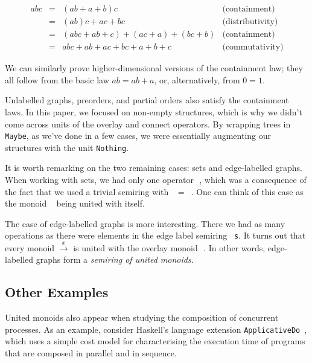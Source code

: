 \documentclass[crc,english]{programming}
\newcommand{\code}[1]{\lstinline[mathescape]|#1|}
\newcommand{\hcode}[1]{{\color{darkblue} \lstinline[keywordstyle={}]|#1|}} %
\newcommand{\hdia}{\,\text{\raisebox{-0.2mm}{\Large\color{darkblue} $\diamond$}}\,}
\newcommand{\zero}{\raisebox{-0.2mm}{\textcircled{\textsf{0}}}\xspace}
\newcommand{\one}{\raisebox{-0.2mm}{\textcircled{\textsf{\hspace{-0.2mm}1}}}\xspace}
\begin{document}
\vspace{-5mm}
\begin{equation*}
\begin{array}{rcll}
\textit{abc} & = & (\textit{ab} + a + b)c & \text{(containment)}\\
 & = & (\textit{ab})c + \textit{ac} + \textit{bc} & \text{(distributivity)}\\
 & = & (\textit{abc} + \textit{ab} + c) + (\textit{ac} + a) + (\textit{bc} + b) & \text{(containment)}\\
 & = & \textit{abc} + \textit{ab} + \textit{ac} + \textit{bc} + a + b + c & \text{(commutativity)}
\end{array}
\end{equation*}
\vspace{-3mm}

\noindent
We can similarly prove higher-dimensional versions of the containment law; they
all follow from the basic law $\textit{ab} = \textit{ab} + a$, or,
alternatively, from $0 = 1$.

Unlabelled graphs, preorders, and partial orders also satisfy the containment
laws. In this paper, we focused on non-empty structures, which is why we didn't
come across units of the overlay and connect operators. By wrapping trees in
\hcode{Maybe}, as we've done in a few cases, we were essentially augmenting our
structures with the unit \hcode{Nothing}.

It is worth remarking on the two remaining cases: sets and edge-labelled graphs.
When working with sets, we had only one operator \hdia, which was a consequence
of the fact that we used a trivial semiring with \zero~$=$~\one. One can think
of this case as the monoid \hdia~being united with itself.

The case of edge-labelled graphs is more interesting. There we had as many
operations as there were elements in the edge label semiring~\hcode{s}. It turns
out that every monoid $\xrightarrow{x}$ is united with the overlay monoid \hdia.
In other words, edge-labelled graphs form a \emph{semiring of united monoids}.

\subsection{Other Examples}

United monoids also appear when studying the composition of concurrent
processes. As an example, consider Haskell's language extension
\code{ApplicativeDo}~\cite{applicativedo}, which uses a simple cost model for
characterising the execution time of programs that are composed in parallel and
in sequence.
\end{document}
